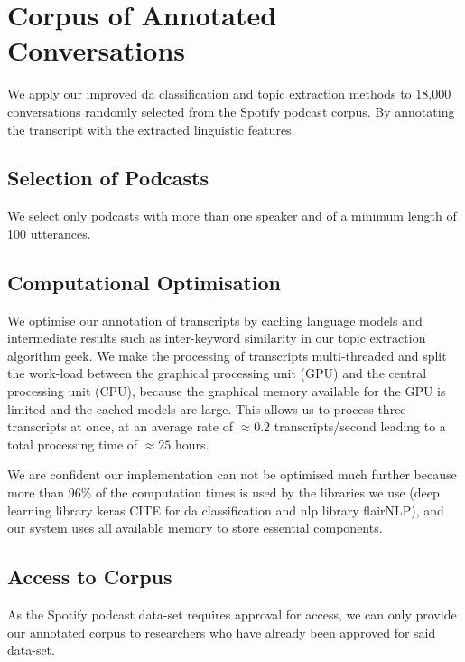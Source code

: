 {\let\clearpage\relax \chapter[Annotated Corpus]{Corpus of Annotated Conversations}}

We apply our improved \gls{da} classification and topic extraction methods to 18,000 conversations randomly selected from the Spotify podcast corpus\cite{clifton-2020100000}. By annotating the transcript with the extracted linguistic features.

\section{Selection of Podcasts}
We select only podcasts with more than one speaker and of a minimum length of 100 \glspl{utterance}.

\section{Computational Optimisation}
We optimise our annotation of transcripts by caching language models and intermediate results such as inter-keyword similarity in our topic extraction algorithm \gls{geek}.
We make the processing of transcripts multi-threaded and split the work-load between the graphical processing unit (GPU) and the central processing unit (CPU), because the graphical memory available for the GPU is limited and the cached models are large. This allows us to process three transcripts at once, at an average rate of $\approx 0.2$ transcripts/second leading to a total processing time of $\approx 25$ hours.

We are confident our implementation can not be optimised much further because more than $96\%$ of the computation times is used by the libraries we use (deep learning library keras CITE for \gls{da} classification and \gls{nlp} library flairNLP\cite{flairNLP}), and our system uses all available memory to store essential components.

\section{Access to Corpus}

As the Spotify podcast data-set requires approval for access, we can only provide our annotated corpus to researchers who have already been approved for said data-set. \newline